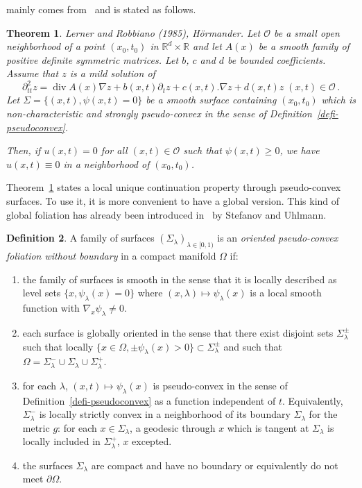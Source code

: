 \documentclass[10pt]{amsart}
\newtheorem{theo}{Theorem}[section]
\theoremstyle{definition}\newtheorem{defi}[theo]{Definition}\newtheorem{rema}[theo]{Remark}\newtheorem{exam}[theo]{Example}\newtheorem{exem}[theo]{Example}\newtheorem{nota}[theo]{Notation}
\newcommand{\RR}{\mathbb{R}}
\newcommand{\Oc}{\mathcal{O}}
\newcommand{\grad}{\nabla}
\renewcommand{\div}{\operatorname{div}}
\newcommand*{\romanenumi}{\renewcommand*{\theenumi}{\roman{enumi}}}
\begin{document}
\cite[Theorem~28.4.3]{Hormander} mainly comes from~\cite{LR} and is stated as follows.

\begin{theo}\label{th-hormander}
\emph{Lerner and Robbiano (1985), H\"ormander.}
Let $\Oc$ be a small open neighborhood of a point $(x_0,t_0)$ in $\RR^d\times
\RR$ and let $A(x)$ be a smooth family of positive definite symmetric matrices. Let $b$, $c$ and $d$ be bounded coefficients. Assume that $z$ is a mild solution of
\begin{equation}\label{eq-LR}
\partial^2_{tt} z=\div A(x)\grad z + b(x,t)\partial_t z+c(x,t).\grad z+d(x,t)z\;(x,t)\in\Oc\,.
\end{equation}
Let $\Sigma=\{(x,t),\psi(x,t)=0\}$ be a smooth surface containing $(x_0,t_0)$ which is non-characteristic and strongly pseudo-convex in the sense of Definition~\ref{defi-pseudoconvex}.

Then, if $u(x,t)=0$ for all $(x,t)\in\Oc$ such that $\psi(x,t)\geq 0$, we have $u(x,t)\equiv 0$ in a neighborhood of $(x_0,t_0)$.
\end{theo}

Theorem~\ref{th-hormander} states a local unique continuation property through pseudo-convex surfaces. To use it, it is more convenient to have a global version. This kind of global foliation has already been introduced in~\cite{Stefanov-Uhlmann} by Stefanov and Uhlmann.

\begin{defi}\label{defi-foliation1}
A family of surfaces $(\Sigma_\lambda)_{\lambda\in[0,1)}$ is an \emph{oriented pseudo-convex foliation without boundary} in a compact manifold $\Omega$ if:
\begin{enumerate}\romanenumi
\item \label{listdef6.4.1}the family of surfaces is smooth in the sense that it is locally described as level sets $\{x,\psi_\lambda(x)=0\}$ where $(x,\lambda)\mapsto\psi_\lambda(x)$ is a local smooth function with $\grad_x\psi_\lambda\neq 0$.
\item \label{listdef6.4.2}each surface is globally oriented in the sense that there exist disjoint sets $\Sigma_\lambda^\pm$ such that locally $\{x\in\Omega,\pm\psi_\lambda(x)> 0\}\subset \Sigma_\lambda^\pm$ and such that $\Omega=\Sigma_\lambda^- \cup
\Sigma_\lambda \cup \Sigma_\lambda^+$.
\item \label{listdef6.4.3}for each $\lambda$, $(x,t)\mapsto \psi_\lambda(x)$ is pseudo-convex in the sense of Definition~\ref{defi-pseudoconvex} as a function independent of $t$. Equivalently, $\Sigma_\lambda^-$ is locally strictly convex in a neighborhood of its boundary $\Sigma_\lambda$ for the metric $g$: for each $x\in\Sigma_\lambda$, a geodesic through $x$ which is tangent at $\Sigma_\lambda$ is locally included in $\Sigma_\lambda^+$, $x$ excepted.
\item \label{listdef6.4.4}the surfaces $\Sigma_\lambda$ are compact and have no boundary or equivalently do not meet $\partial\Omega$.
\end{enumerate}
\end{defi}
\end{document}
